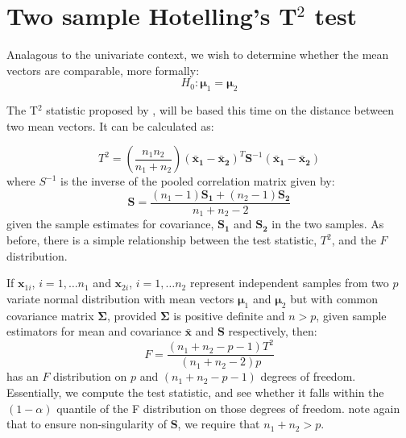 \section{Two sample Hotelling's T$^{2}$  test}
\label{t2}

Analagous to the univariate context, we wish to determine whether the mean vectors are comparable, more formally:
\begin{equation}
H_{0}: \boldsymbol{\mu}_{1} = \boldsymbol{\mu}_{2}
\end{equation}

The T$^{2}$ statistic proposed by \cite{Hotelling:1931}, will be based this time on the distance between two mean vectors.   It can be calculated as:

\begin{equation}
\label{hotelling}
T^{2} = \left(\frac{n_{1}n_{2}}{n_{1}+n_{2}}\right)(\boldsymbol{\bar{x}_{1}} - \boldsymbol{\bar{x}_{2}})^{T}\boldsymbol{S}^{-1}(\boldsymbol{\bar{x}_{1}} - \boldsymbol{\bar{x}_{2}})
\end{equation}
where $S^{-1}$ is the inverse of the pooled correlation matrix given by:
\begin{displaymath}
\label{poolcov}
\boldsymbol{S} = \frac{(n_{1} - 1) \boldsymbol{S_{1}} + (n_{2} - 1) \boldsymbol{S_{2}}}{n_{1} + n_{2} - 2}
\end{displaymath}
given the sample estimates for covariance, $\boldsymbol{S_{1}}$ and $\boldsymbol{S_{2}}$ in the two samples.   As before, there is a simple relationship between the test statistic, $T^2$, and the $F$ distribution.   

If $\boldsymbol{x}_{1i}$, $i = 1, \ldots n_{1}$ and $\boldsymbol{x}_{2i}$, $i = 1, \ldots n_{2}$ represent independent samples from two $p$ variate normal distribution with mean vectors $\boldsymbol{\mu}_{1}$ and  $\boldsymbol{\mu}_{2}$ but with common covariance matrix $\boldsymbol{\Sigma}$, provided $\boldsymbol{\Sigma}$ is positive definite and $n > p$, given sample estimators for mean and covariance $\bar{\boldsymbol{x}}$ and $\boldsymbol{S}$ respectively, then:
\begin{displaymath}
F = \frac{(n_{1} + n_{2} - p - 1) T^{2}}{(n_{1} + n_{2} - 2)p}
\end{displaymath}
has an $F$ distribution on $p$ and $(n_{1}+n_{2}-p-1)$ degrees of freedom.   Essentially, we compute the test statistic, and see whether it falls within the $(1-\alpha)$ quantile of the F distribution on those degrees of freedom.   note again that to ensure non-singularity of $\boldsymbol{S}$, we require that $n_{1}+n_{2} > p$.

